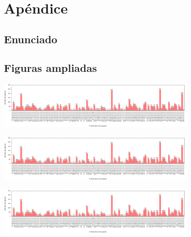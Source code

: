 \section{Apéndice}

\subsection{Enunciado}


\subsection{Figuras ampliadas}

\includegraphics[width=10cm,trim={0 0 35.95cm 0},clip]{../mediciones/altop-wifi-60/altop60IpsDstArp.png}

\includegraphics[width=10cm,trim={17cm 0 20.7cm 0},clip]{../mediciones/altop-wifi-60/altop60IpsDstArp.png}

\includegraphics[width=10cm,trim={32.26cm 0 0 0},clip]{../mediciones/altop-wifi-60/altop60IpsDstArp.png}
